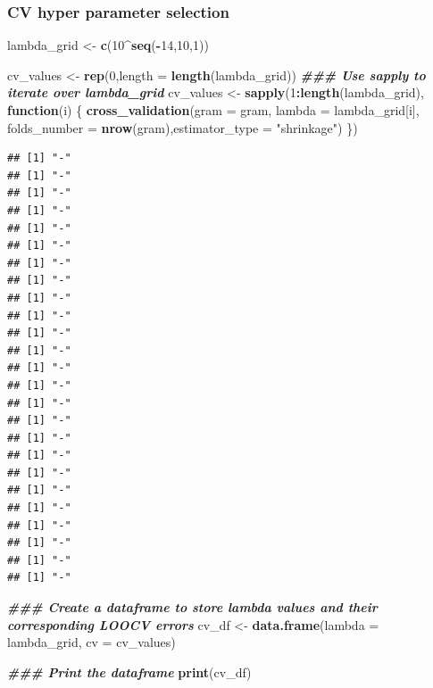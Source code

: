 \documentclass[
]{article}
\newenvironment{Shaded}{\begin{snugshade}}{\end{snugshade}}
\newcommand{\AttributeTok}[1]{\textcolor[rgb]{0.13,0.29,0.53}{#1}}
\newcommand{\ControlFlowTok}[1]{\textcolor[rgb]{0.13,0.29,0.53}{\textbf{#1}}}
\newcommand{\DecValTok}[1]{\textcolor[rgb]{0.00,0.00,0.81}{#1}}
\newcommand{\DocumentationTok}[1]{\textcolor[rgb]{0.56,0.35,0.01}{\textbf{\textit{#1}}}}
\newcommand{\FunctionTok}[1]{\textcolor[rgb]{0.13,0.29,0.53}{\textbf{#1}}}
\newcommand{\NormalTok}[1]{#1}
\newcommand{\OtherTok}[1]{\textcolor[rgb]{0.56,0.35,0.01}{#1}}
\newcommand{\SpecialCharTok}[1]{\textcolor[rgb]{0.81,0.36,0.00}{\textbf{#1}}}
\newcommand{\StringTok}[1]{\textcolor[rgb]{0.31,0.60,0.02}{#1}}
\begin{document}
\subsubsection{CV hyper parameter
selection}\label{cv-hyper-parameter-selection}

\begin{Shaded}
\begin{Highlighting}[]
\NormalTok{lambda\_grid }\OtherTok{\textless{}{-}} \FunctionTok{c}\NormalTok{(}\DecValTok{10}\SpecialCharTok{\^{}}\FunctionTok{seq}\NormalTok{(}\SpecialCharTok{{-}}\DecValTok{14}\NormalTok{,}\DecValTok{10}\NormalTok{,}\DecValTok{1}\NormalTok{))}

\NormalTok{cv\_values }\OtherTok{\textless{}{-}} \FunctionTok{rep}\NormalTok{(}\DecValTok{0}\NormalTok{,}\AttributeTok{length =} \FunctionTok{length}\NormalTok{(lambda\_grid))}
\DocumentationTok{\#\#\# Use sapply to iterate over lambda\_grid}
\NormalTok{cv\_values }\OtherTok{\textless{}{-}} \FunctionTok{sapply}\NormalTok{(}\DecValTok{1}\SpecialCharTok{:}\FunctionTok{length}\NormalTok{(lambda\_grid), }\ControlFlowTok{function}\NormalTok{(i) \{}
  \FunctionTok{cross\_validation}\NormalTok{(}\AttributeTok{gram =}\NormalTok{ gram, }\AttributeTok{lambda =}\NormalTok{ lambda\_grid[i], }\AttributeTok{folds\_number =} \FunctionTok{nrow}\NormalTok{(gram),}\AttributeTok{estimator\_type =} \StringTok{"shrinkage"}\NormalTok{)}
\NormalTok{\})}
\end{Highlighting}
\end{Shaded}

\begin{verbatim}
## [1] "-"
## [1] "-"
## [1] "-"
## [1] "-"
## [1] "-"
## [1] "-"
## [1] "-"
## [1] "-"
## [1] "-"
## [1] "-"
## [1] "-"
## [1] "-"
## [1] "-"
## [1] "-"
## [1] "-"
## [1] "-"
## [1] "-"
## [1] "-"
## [1] "-"
## [1] "-"
## [1] "-"
## [1] "-"
## [1] "-"
## [1] "-"
## [1] "-"
\end{verbatim}

\begin{Shaded}
\begin{Highlighting}[]
\DocumentationTok{\#\#\# Create a dataframe to store lambda values and their corresponding LOOCV errors}
\NormalTok{cv\_df }\OtherTok{\textless{}{-}} \FunctionTok{data.frame}\NormalTok{(}\AttributeTok{lambda =}\NormalTok{ lambda\_grid, }\AttributeTok{cv =}\NormalTok{ cv\_values)}

\DocumentationTok{\#\#\# Print the dataframe}
\FunctionTok{print}\NormalTok{(cv\_df)}
\end{Highlighting}
\end{Shaded}
\end{document}
